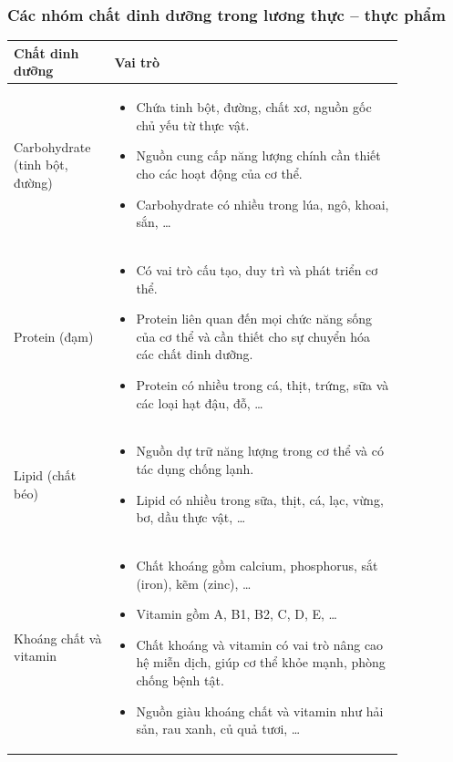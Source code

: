 \documentclass[Main.tex]{subfiles}
\begin{document}
\begin{kienthuccannho}
	\subsubsection{Các nhóm chất dinh dưỡng trong lương thực – thực phẩm}
	\begin{center}
		\renewcommand{\arraystretch}{1.15}
		\begin{tabular}{|C{0.2\linewidth}|L{0.65\linewidth}|}
			\hline
			\textbf{Chất dinh dưỡng} & \textbf{Vai trò} \\
			\hline
			Carbohydrate (tinh bột, đường)
			&
			\begin{itemize}
				\item Chứa tinh bột, đường, chất xơ, nguồn gốc chủ yếu từ thực vật.
				\item Nguồn cung cấp năng lượng chính cần thiết cho các hoạt động của cơ thể.
				\item Carbohydrate có nhiều trong lúa, ngô, khoai, sắn, …
			\end{itemize}
			\\
			\hline
			Protein (đạm)
			&
			\begin{itemize}
				\item Có vai trò cấu tạo, duy trì và phát triển cơ thể.
				\item Protein liên quan đến mọi chức năng sống của cơ thể và cần thiết cho sự chuyển hóa các chất dinh dưỡng.
				\item Protein có nhiều trong cá, thịt, trứng, sữa và các loại hạt đậu, đỗ, …
			\end{itemize}
			\\
			\hline
			Lipid (chất béo)
			&
			\begin{itemize}
				\item Nguồn dự trữ năng lượng trong cơ thể và có tác dụng chống lạnh.
				\item Lipid có nhiều trong sữa, thịt, cá, lạc, vừng, bơ, dầu thực vật, …
			\end{itemize}
			\\
			\hline
			Khoáng chất và vitamin
			&
			\begin{itemize}
				\item Chất khoáng gồm calcium, phosphorus, sắt (iron), kẽm (zinc), …
				\item Vitamin gồm A, B1, B2, C, D, E, …
				\item Chất khoáng và vitamin có vai trò nâng cao hệ miễn dịch, giúp cơ thể khỏe mạnh, phòng chống bệnh tật.
				\item Nguồn giàu khoáng chất và vitamin như hải sản, rau xanh, củ quả tươi, …
			\end{itemize}
			\\
			\hline
		\end{tabular}
	\end{center}

\end{kienthuccannho}
\end{document}
